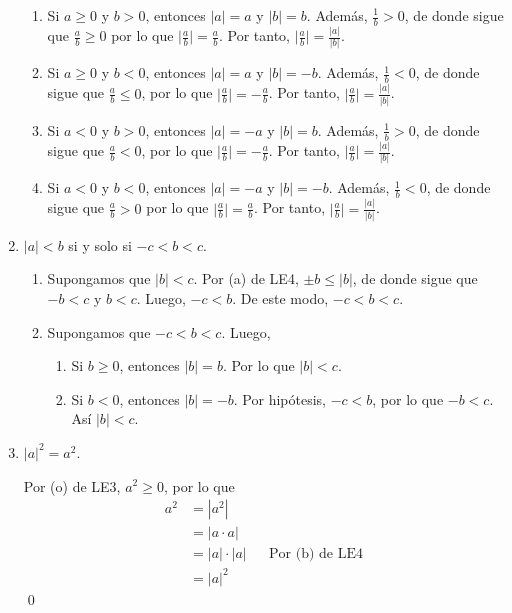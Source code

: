 \documentclass[11pt]{article}
\begin{document}
\begin{enumerate}[label=\alph*)]
\begin{enumerate}[label=\roman*)]
    \item Si $a \geq 0$ y $b>0$, entonces $|a|=a$ y $|b|=b$. Además, $\frac{1}{b} >0$, de donde sigue que $\frac{a}{b} \geq 0$ por lo que $\big| \frac{a}{b} \big| = \frac{a}{b}$. Por tanto, $ \big| \frac{a}{b} \big| = \frac{|a|}{|b|}$.
    \item Si $a \geq 0$ y $b<0$, entonces $|a|=a$ y $|b|=-b$. Además, $\frac{1}{b} <0$, de donde sigue que $\frac{a}{b} \leq 0$, por lo que $\big| \frac{a}{b} \big| =- \frac{a}{b}$. Por tanto, $ \big| \frac{a}{b} \big| = \frac{|a|}{|b|}$.
    \item Si $a<0$ y $b>0$, entonces $|a|=-a$ y $|b|=b$. Además, $\frac{1}{b} >0$, de donde sigue que $\frac{a}{b} < 0$, por lo que $\big| \frac{a}{b} \big| =- \frac{a}{b}$. Por tanto, $ \big| \frac{a}{b} \big| = \frac{|a|}{|b|}$.
    \item Si $a<0$ y $b<0$, entonces $|a|=-a$ y $|b|=-b$. Además, $\frac{1}{b} <0$, de donde sigue que $\frac{a}{b} > 0$ por lo que $\big| \frac{a}{b} \big| = \frac{a}{b}$. Por tanto, $ \big| \frac{a}{b} \big| = \frac{|a|}{|b|}$.
\end{enumerate}
\item $|a|<b$ si y solo si $-c<b<c$.

\begin{enumerate}[label=\roman*)]
    \item Supongamos que $|b|<c$. Por (a) de LE4, $ \pm b \leq |b|$, de donde sigue que $-b<c$ y $b<c$. Luego, $-c<b$. De este modo, $-c<b<c$.
    \item Supongamos que $-c<b<c$. Luego,
        \begin{enumerate}[label=\arabic*)]
            \item Si $b \geq 0$, entonces $|b|=b$. Por lo que $|b|<c$.
            \item Si $b < 0$, entonces $|b|=-b$. Por hipótesis, $-c<b$, por lo que $-b<c$. Así $|b|<c$.
        \end{enumerate}
\end{enumerate}

\item $|a|^2=a^2$.

Por (o) de LE3, $a^2\geq 0$, por lo que \begin{align*}
    a^2 &= |a^2|\\
    &= |a\cdot a|\\
    &= |a| \cdot |a| && \text{Por (b) de LE4}\\
    &= |a|^2
\end{align*} \qed
\end{enumerate}
\end{document}

